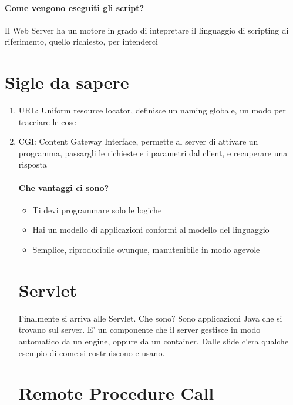 \documentclass[12pt, a4paper, openany, twoside]{book}
\begin{document}
\paragraph{Come vengono eseguiti gli script?} Il Web Server ha un motore in grado
di intepretare il linguaggio di scripting di riferimento, quello richiesto, per intenderci
\section{Sigle da sapere}
\begin{enumerate}
	\item URL: Uniform resource locator, definisce un naming globale, un modo per 
	tracciare le cose
	\item CGI: Content Gateway Interface, permette al server di attivare un 
	programma, passargli le richieste e i parametri dal client, e recuperare 
	una risposta
	\paragraph{Che vantaggi ci sono?}
	\begin{itemize}
		\item Ti devi programmare solo le logiche
		\item Hai un modello di applicazioni conformi al modello del linguaggio
		\item Semplice, riproducibile ovunque, manutenibile in modo agevole
	\end{itemize}
	\section{Servlet}
	Finalmente si arriva alle Servlet. Che sono? Sono applicazioni Java che si 
	trovano sul server. E' un componente che il server gestisce in modo automatico
	da un engine, oppure da un container. 
	Dalle slide c'era qualche esempio di come si costruiscono e usano.
	\section{Remote Procedure Call}
\end{enumerate}






















    
\end{document}
